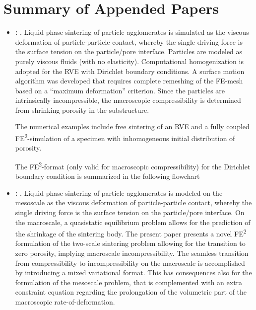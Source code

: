 \documentclass[MikaelDissertation.tex]{subfiles}
\begin{document}
\chapter{Summary of Appended Papers}

\begin{itemize}
 \item \textbf{: }.
Liquid phase sintering of particle agglomerates is simulated as the viscous deformation of particle-particle contact, whereby the single driving force is the surface tension on the particle/pore interface.
Particles are modeled as purely viscous fluids (with no elasticity). 
Computational homogenization is adopted for the RVE with Dirichlet boundary conditions.
A surface motion algorithm was developed that requires complete remeshing of the FE-mesh based on a ``maximum deformation'' criterion. 
Since the particles are intrinsically incompressible, the macroscopic compressibility is determined from shrinking porosity in the substructure.

The numerical examples include free sintering of an RVE and a fully coupled FE\textsuperscript{2}-simulation of a specimen with inhomogeneous initial distribution of porosity.

The FE\textsuperscript{2}-format (only valid for macroscopic compressibility) for the Dirichlet boundary condition is summarized in the following flowchart
\begin{center}
  
\end{center}

 \item \textbf{: }.
Liquid phase sintering of particle agglomerates is modeled on the mesoscale as the viscous deformation of particle-particle contact, whereby the single driving force is the surface tension on the particle/pore interface.
On the macroscale, a quasistatic equilibrium problem allows for the prediction of the shrinkage of the sintering body. 
The present paper presents a novel FE\textsuperscript{2} formulation of the two-scale sintering problem allowing for the transition to zero porosity, implying macroscale incompressibility.
The seamless transition from compressibility to incompressibility on the macroscale is accomplished by introducing a mixed variational format.
This has consequences also for the formulation of the mesoscale problem, that is complemented with an extra constraint equation regarding the prolongation of the volumetric part of the macroscopic rate-of-deformation.


\end{itemize}
\end{document}
